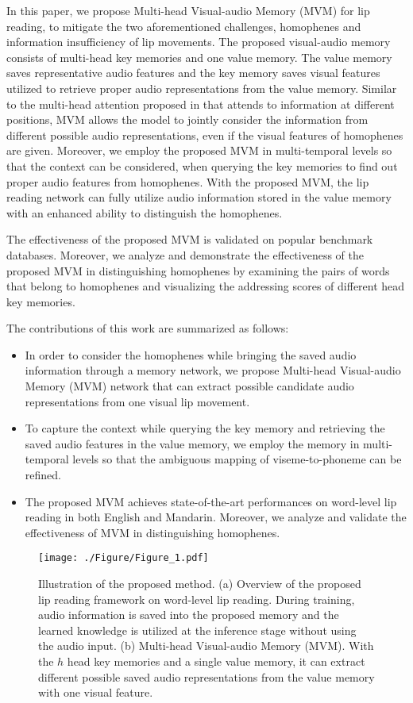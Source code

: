 \documentclass[letterpaper]{article} \usepackage{aaai22}  \usepackage{times}  \usepackage{helvet}  \usepackage{courier}  \usepackage[hyphens]{url}  \usepackage{graphicx} \urlstyle{rm} \def\UrlFont{\rm}  \usepackage{natbib}  \usepackage{caption} \DeclareCaptionStyle{ruled}{labelfont=normalfont,labelsep=colon,strut=off} \frenchspacing  \setlength{\pdfpagewidth}{8.5in}  \setlength{\pdfpageheight}{11in}  \usepackage{algorithm}
\begin{document}
In this paper, we propose Multi-head Visual-audio Memory (MVM) for lip reading, to mitigate the two aforementioned challenges, homophenes and information insufficiency of lip movements. The proposed visual-audio memory consists of multi-head key memories and one value memory. The value memory saves representative audio features and the key memory saves visual features utilized to retrieve proper audio representations from the value memory. Similar to the multi-head attention proposed in \cite{vaswani2017attention} that attends to information at different positions, MVM allows the model to jointly consider the information from different possible audio representations, even if the visual features of homophenes are given. Moreover, we employ the proposed MVM in multi-temporal levels so that the context can be considered, when querying the key memories to find out proper audio features from homophenes. With the proposed MVM, the lip reading network can fully utilize audio information stored in the value memory with an enhanced ability to distinguish the homophenes. 

The effectiveness of the proposed MVM is validated on popular benchmark databases. Moreover, we analyze and demonstrate the effectiveness of the proposed MVM in distinguishing homophenes by examining the pairs of words that belong to homophenes and visualizing the addressing scores of different head key memories. 

The contributions of this work are summarized as follows:
\begin{itemize}
    \item In order to consider the homophenes while bringing the saved audio information through a memory network, we propose Multi-head Visual-audio Memory (MVM) network that can extract possible candidate audio representations from one visual lip movement.
    \item To capture the context while querying the key memory and retrieving the saved audio features in the value memory, we employ the memory in multi-temporal levels so that the ambiguous mapping of viseme-to-phoneme can be refined.
    \item The proposed MVM achieves state-of-the-art performances on word-level lip reading in both English and Mandarin. Moreover, we analyze and validate the effectiveness of MVM in distinguishing homophenes.
\end{itemize}

\begin{figure*}[t!]
	\begin{minipage}[b]{1.0\linewidth}
		\centering
		\centerline{\texttt{[image: ./Figure/Figure\_1.pdf]}}
	\end{minipage}
	\caption{Illustration of the proposed method. (a) Overview of the proposed lip reading framework on word-level lip reading. During training, audio information is saved into the proposed memory and the learned knowledge is utilized at the inference stage without using the audio input. (b) Multi-head Visual-audio Memory (MVM). With the $h$ head key memories and a single value memory, it can extract different possible saved audio representations from the value memory with one visual feature.}
	\label{fig:1}
\end{figure*}
\end{document}
